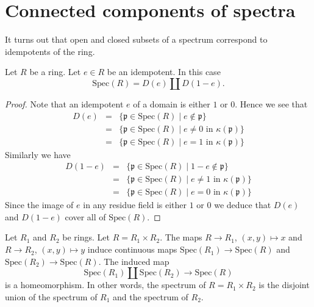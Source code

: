 \section{Connected components of spectra}
\label{section-connected-components}

\noindent
It turns out that open and closed subsets of a spectrum correspond to
idempotents of the ring.

\begin{lemma}
\label{lemma-idempotent-spec}
Let $R$ be a ring. Let $e \in R$ be an idempotent.
In this case
$$
\text{Spec}(R) = D(e) \coprod D(1-e).
$$
\end{lemma}

\begin{proof}
Note that an idempotent $e$ of a domain is either $1$ or $0$.
Hence we see that
\begin{eqnarray*}
D(e)
& = &
\{ \mathfrak p \in \text{Spec}(R)
\mid
e \not\in \mathfrak p \} \\
& = &
\{ \mathfrak p \in \text{Spec}(R)
\mid
e \not= 0\text{ in }\kappa(\mathfrak p) \} \\
& = &
\{ \mathfrak p \in \text{Spec}(R)
\mid
e = 1\text{ in }\kappa(\mathfrak p) \}
\end{eqnarray*}
Similarly we have
\begin{eqnarray*}
D(1-e)
& = &
\{ \mathfrak p \in \text{Spec}(R)
\mid
1 - e \not\in \mathfrak p \} \\
& = &
\{ \mathfrak p \in \text{Spec}(R)
\mid
e \not= 1\text{ in }\kappa(\mathfrak p) \} \\
& = &
\{ \mathfrak p \in \text{Spec}(R)
\mid
e = 0\text{ in }\kappa(\mathfrak p) \}
\end{eqnarray*}
Since the image of $e$ in any residue field is either $1$ or $0$
we deduce that $D(e)$ and $D(1-e)$ cover all of $\text{Spec}(R)$.
\end{proof}

\begin{lemma}
\label{lemma-spec-product}
Let $R_1$ and $R_2$ be rings.
Let $R = R_1 \times R_2$.
The maps $R \to R_1$, $(x, y) \mapsto x$ and $R \to R_2$,
$(x, y) \mapsto y$
induce continuous maps $\text{Spec}(R_1) \to \text{Spec}(R)$ and
$\text{Spec}(R_2) \to \text{Spec}(R)$.
The induced map
$$
\text{Spec}(R_1) \coprod \text{Spec}(R_2)
\longrightarrow
\text{Spec}(R)
$$
is a homeomorphism. In other words,
the spectrum of $R = R_1\times R_2$ is the
disjoint union of the spectrum of $R_1$ and the
spectrum of $R_2$.
\end{lemma}

